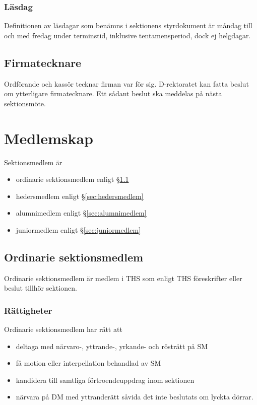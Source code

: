 \documentclass{dgovdoc}
\begin{document}
\subsubsection{Läsdag}

Definitionen av läsdagar som benämns i sektionens styrdokument är
måndag till och med fredag under terminstid, inklusive tentamensperiod, dock ej helgdagar.

\subsection{Firmatecknare}

Ordförande och kassör tecknar firman var för sig. D-rektoratet kan fatta beslut
om ytterligare firmatecknare. Ett sådant beslut ska meddelas på nästa
sektionsmöte.

\section{Medlemskap}

Sektionsmedlem är

\begin{itemize}
  \item ordinarie sektionsmedlem enligt \S\ref{sec:ordinarie_sektionsmedlem}
  \item hedersmedlem enligt \S\ref{sec:hedersmedlem}
  \item alumnimedlem enligt \S\ref{sec:alumnimedlem}
  \item juniormedlem enligt \S\ref{sec:juniormedlem}
\end{itemize}

\subsection{Ordinarie sektionsmedlem}
\label{sec:ordinarie_sektionsmedlem}

Ordinarie sektionsmedlem är medlem i THS som enligt THS föreskrifter eller
beslut tillhör sektionen.

\subsubsection{Rättigheter}

Ordinarie sektionsmedlem har rätt att

\begin{itemize}
  \item deltaga med närvaro-, yttrande-, yrkande- och rösträtt på SM
  \item få motion eller interpellation behandlad av SM
  \item kandidera till samtliga förtroendeuppdrag inom sektionen
  \item närvara på DM med yttranderätt såvida det inte beslutats om lyckta dörrar.
\end{itemize}
\end{document}
